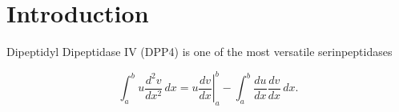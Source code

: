 \section{Introduction}
\label{intro} 

Dipeptidyl Dipeptidase IV (DPP4) is one of the most versatile serinpeptidases   

\begin{equation}
\label{eqn:drag}
	\int_a^bu\frac{d^2v}{dx^2}\,dx
	=\left.u\frac{dv}{dx}\right|_a^b
	-\int_a^b\frac{du}{dx}\frac{dv}{dx}\,dx.
\end{equation}
